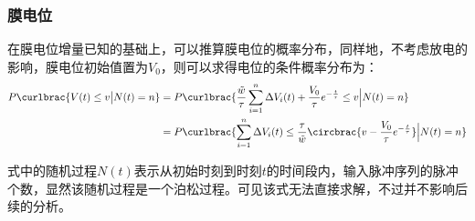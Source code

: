 \documentclass[11pt]{article}
\begin{document}
\subsubsection{膜电位}
在膜电位增量已知的基础上，可以推算膜电位的概率分布，同样地，不考虑放电的影响，膜电位初始值置为$V_0$，则可以求得电位的条件概率分布为：
\begin{align}
  \begin{aligned}
    P\curlbrac{V(t)\le v
    \big|  N(t)=n} & =P\curlbrac{\frac{\tilde{w}}{\tau}\sum_{i=1}^{n}\Delta V_i(t)+\frac{V_0}{\tau}e^{-\frac{t}{\tau}}\le v\Big| N(t)=n}            \\
                   & =P\curlbrac{\sum_{i=1}^{n}\Delta V_i(t)\le \frac{\tau}{\tilde{w}}\circbrac{v-\frac{V_0}{\tau}e^{-\frac{t}{\tau}}}\Big| N(t)=n}
  \end{aligned}
  \label{eq:膜电位的条件分布概率}
\end{align}\par
式中的随机过程$N(t)$表示从初始时刻到时刻$t$的时间段内，输入脉冲序列的脉冲个数，显然该随机过程是一个泊松过程。可见该式无法直接求解，不过并不影响后续的分析。
\end{document}
